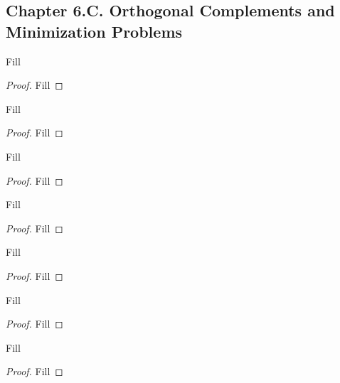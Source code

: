 \subsection*{Chapter 6.C. Orthogonal Complements and Minimization Problems}


\begin{exercise}{1}
  Fill
\end{exercise}
\begin{proof}
 Fill
\end{proof}

\begin{exercise}{2}
  Fill
\end{exercise}
\begin{proof}
 Fill
\end{proof}

\begin{exercise}{3}
  Fill
\end{exercise}
\begin{proof}
 Fill
\end{proof}

\begin{exercise}{5}
  Fill
\end{exercise}
\begin{proof}
 Fill
\end{proof}

\begin{exercise}{6}
  Fill
\end{exercise}
\begin{proof}
 Fill
\end{proof}

\begin{exercise}{7}
  Fill
\end{exercise}
\begin{proof}
 Fill
\end{proof}

\begin{exercise}{14}
  Fill
\end{exercise}
\begin{proof}
 Fill
\end{proof}